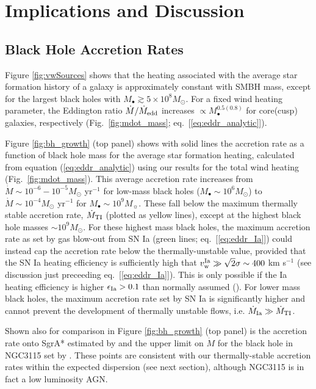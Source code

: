 \documentclass[usenatbib,fleqn]{mn2e}
\begin{document}
\section{Implications and Discussion}
\label{sec:discussion}

\subsection{Black Hole Accretion Rates}
\label{sec:mdot}

Figure \ref{fig:vwSources} shows that the heating associated with the
average star formation history of a galaxy is approximately constant
with SMBH mass, except for the largest black holes with $M_{\bullet}
\gtrsim 5\times 10^{8}M_{\odot}$.  For a fixed wind heating parameter,
the Eddington ratio $\dot{M}/\dot{M}_{\rm edd}$ increases $\propto
M_{\bullet}^{0.5(0.8)}$ for core(cusp) galaxies, respectively
(Fig.~\ref{fig:mdot_mass}; eq.~[\ref{eq:eddr_analytic}]).

Figure \ref{fig:bh_growth} (top panel) shows with solid lines the
accretion rate as a function of black hole mass for the average star
formation heating, calculated from equation (\ref{eq:eddr_analytic})
using our results for the total wind heating
(Fig.~\ref{fig:mdot_mass}).  This average accretion rate increases
from $\dot{M} \sim 10^{-6}-10^{-5}M_{\odot}$ yr$^{-1}$ for low-mass
black holes ($M_{\bullet} \sim 10^{6}M_{\odot}$) to $\dot{M} \sim
10^{-4}M_{\odot}$ yr$^{-1}$ for $M_{\bullet} \sim 10^{9}M_{\sun}$.
These fall below the maximum thermally stable accretion rate,
$\dot{M}_{\rm TI}$ (plotted as yellow lines), except at the highest
black hole masses $\sim 10^{9}M_{\odot}$.  For these highest mass
black holes, the maximum accretion rate as set by gas blow-out from SN
Ia (green lines; eq.~[\ref{eq:eddr_Ia}]) could instead cap the
accretion rate below the thermally-unstable value, provided that the
SN Ia heating efficiency is sufficiently high that $v_{\rm w}^{\rm Ia}
\gg \sqrt{2}\sigma \sim 400$ km s$^{-1}$ (see discussion just
preceeding eq.~[\ref{eq:eddr_Ia}]).  This is only possible if the Ia
heating efficiency is higher $\epsilon_{\rm Ia} > 0.1$ than normally
assumed (\citealt{Sharma+14}).  For lower mass black holes, the
maximum accretion rate set by SN Ia is significantly higher and cannot
prevent the development of thermally unstable flows,
i.e. $\dot{M}_{\rm Ia} \gg \dot{M}_{\rm TI}$.

Shown also for comparison in Figure \ref{fig:bh_growth} (top panel) is
the accretion rate onto SgrA* estimated by \citet{Quataert:2004a} and
the upper limit on $\dot{M}$ for the black hole in NGC3115 set by
\citealt{ShcherbakovWong+:2014a}.  These points are consistent with
our thermally-stable accretion rates within the expected dispersion
(see next section), although NGC3115 is in fact a low luminosity AGN.
\end{document}
